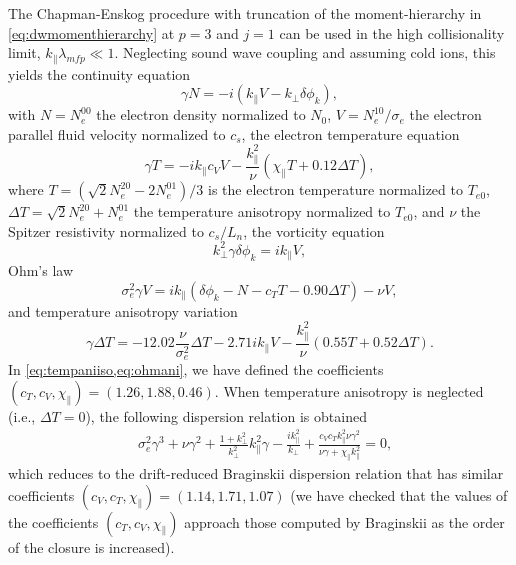 %
The Chapman-Enskog procedure with truncation of the moment-hierarchy in \cref{eq:dwmomenthierarchy} at $p=3$ and $j=1$ can be used in the high collisionality limit, $k_\parallel \lambda_{mfp}\ll 1$.
%
Neglecting sound wave coupling and assuming cold ions, this yields the continuity equation
%
\begin{equation}
    \gamma N=-i( k_\parallel V - k_\perp \delta\phi_k),
\label{eq:contani1}
\end{equation}
%
with $N=N_e^{00}$ the electron density normalized to $N_0$, $V= N_e^{10}/\sigma_e$ the electron parallel fluid velocity normalized to $c_s$, the electron temperature equation
%
\begin{equation}
    \gamma T=- i k_\parallel c_V V- \frac{k_\parallel^2}{\nu} (\chi_{\parallel} T+ 0.12 \Delta T),
\label{eq:tempaniiso}
\end{equation}
%
where $T=(\sqrt{2} N_e^{20}-2 N_e^{01})/3$ is the electron temperature normalized to $T_{e0}$, $\Delta T = \sqrt{2} N_e^{20}+N_e^{01}$ the temperature anisotropy normalized to $T_{e0}$, and $\nu$ the Spitzer resistivity normalized to $c_s/L_n$, the vorticity equation
%
\begin{equation}
    k_\perp^2\gamma\delta\phi_k =i k_\parallel V,
\label{eq:contani}
\end{equation}
%
Ohm's law
%
\begin{equation}
    \sigma_e^2 \gamma V=i k_\parallel(\delta\phi_k-N - c_T T - 0.90 \Delta T) - \nu V,
\label{eq:ohmani}
\end{equation}
%
and temperature anisotropy variation
%
\begin{equation}
    \gamma \Delta T = -12.02 \frac{\nu}{\sigma_e^2} \Delta T - 2.71 i k_{\parallel} V-\frac{k_\parallel^2}{\nu}(0.55 T + 0.52 \Delta T).
\label{eq:tempani}
\end{equation}
%
In \cref{eq:tempaniiso,eq:ohmani}, we have defined the coefficients $(c_T,c_V,\chi_{\parallel})=(1.26,1.88,0.46)$.
%
When temperature anisotropy is neglected (i.e., $\Delta T=0$), the following dispersion relation is obtained
%
\begin{equation}
\begin{split}
    &\sigma_e^2 \gamma^3 + \nu \gamma^2 + \frac{1+ k_\perp^2}{k_\perp^2}k_\parallel^2 \gamma-\frac{i k_\parallel^2}{k_\perp}+\frac{c_V c_T k_\parallel^2 \nu \gamma^2}{\nu \gamma+\chi_{\parallel}{k_\parallel^2}}=0,
\end{split}
\label{eq:drfluid}
\end{equation}
%
which reduces to the drift-reduced Braginskii dispersion relation that has similar coefficients $(c_{V},c_{T},\chi_{\parallel})=(1.14,1.71,1.07)$ \citep{Zeiler1997} (we have checked that the values of the coefficients $(c_T,c_V,\chi_{\parallel})$ approach those computed by Braginskii as the order of the closure is increased).
